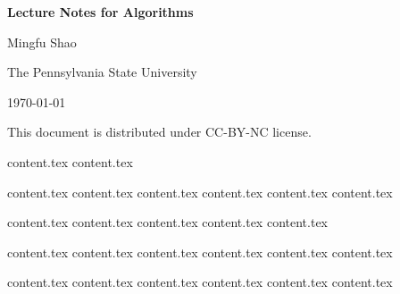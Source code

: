 \documentclass[letterpaper,11pt]{article}
\theoremstyle{mytheorem}
\begin{document}

\thispagestyle{titlestyle}
\begin{center}
\vspace*{4cm} {\Huge \bf Lecture Notes for Algorithms } \vspace*{2cm}

{\Large  Mingfu Shao}

{\Large  The Pennsylvania State University}

{\Large  \today}

\vspace*{8cm}

{\large This document is distributed under CC-BY-NC license.}
\end{center}

\clearpage \newpage


\makeatletter
\renewcommand{\l@section}{\@dottedtocline{1}{0em}{5em}}
\makeatother

\thispagestyle{tablestyle}
\tableofcontents \thispagestyle{tablestyle} \clearpage \newpage

{content.tex} \clearpage\newpage
{content.tex} \clearpage\newpage

{content.tex} \clearpage\newpage
{content.tex} \clearpage\newpage
{content.tex} \clearpage\newpage
{content.tex} \clearpage\newpage
{content.tex} \clearpage\newpage
{content.tex} \clearpage\newpage

{content.tex} \clearpage\newpage
{content.tex} \clearpage\newpage
{content.tex} \clearpage\newpage
{content.tex} \clearpage\newpage
{content.tex} \clearpage\newpage

{content.tex} \clearpage\newpage
{content.tex} \clearpage\newpage
{content.tex} \clearpage\newpage
{content.tex} \clearpage\newpage
{content.tex} \clearpage\newpage
{content.tex} \clearpage\newpage

{content.tex} \clearpage\newpage
{content.tex} \clearpage\newpage
{content.tex} \clearpage\newpage
{content.tex} \clearpage\newpage
{content.tex} \clearpage\newpage
{content.tex} \clearpage\newpage
\end{document}
